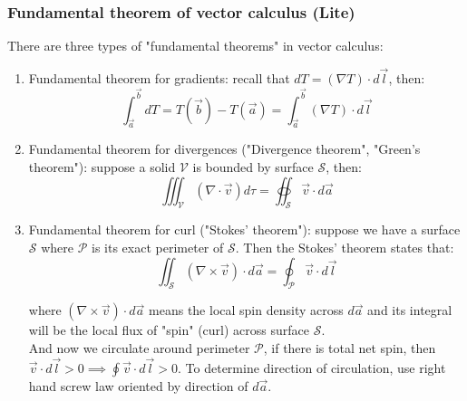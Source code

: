 \documentclass[12pt,a4paper,twoside]{article}
\numberwithin{equation}{section}
\begin{document}
	\subsubsection{Fundamental theorem of vector calculus (Lite)}
	There are three types of "fundamental theorems" in vector calculus:
	\begin{enumerate}
		\item Fundamental theorem for gradients: recall that \(dT=(\nabla T)\cdot d\overrightarrow{l}\), then:
		\begin{equation}
		    \int_{\overrightarrow{a}}^{\overrightarrow{b}}dT=T(\overrightarrow{b})-T(\overrightarrow{a})=\int_{\overrightarrow{a}}^{\overrightarrow{b}}(\nabla T)\cdot d\overrightarrow{l}
		    \label{eq:9}
		\end{equation}
		
		\item Fundamental theorem for divergences ("Divergence theorem", "Green's theorem"): suppose a solid \(\mathcal{V}\) is bounded by surface \(\mathcal{S}\), then:
		\begin{equation}
		    \iiint_{\mathcal{V}}(\nabla \cdot \overrightarrow{v})d\tau=\oiint_{\mathcal{S}}\overrightarrow{v}\cdot d\overrightarrow{a}
		    \label{eq:10}
		\end{equation}
		
		\item Fundamental theorem for curl ("Stokes' theorem"): suppose we have a surface \(\mathcal{S}\) where \(\mathcal{P}\) is its exact perimeter of \(\mathcal{S}\). Then the Stokes' theorem states that:
		\begin{equation}
		    \iint_{\mathcal{S}}(\nabla\times\overrightarrow{v})\cdot d\overrightarrow{a}=\oint_{\mathcal{P}}\overrightarrow{v}\cdot d\overrightarrow{l}
		    \label{eq:11}
		\end{equation}
		
		where \((\nabla \times \overrightarrow{v})\cdot d\overrightarrow{a}\) means the local spin density across \(d\overrightarrow{a}\) and its integral will be the local flux of "spin" (curl) across surface \(\mathcal{S}\).\\
		
		And now we circulate around perimeter \(\mathcal{P}\), if there is total net spin, then \(\overrightarrow{v}\cdot d\overrightarrow{l}>0\implies\oint\overrightarrow{v}\cdot d\overrightarrow{l}>0\). To determine direction of circulation, use right hand screw law oriented by direction of $d\overrightarrow{a}$.
	\end{enumerate}
	
\end{document}
